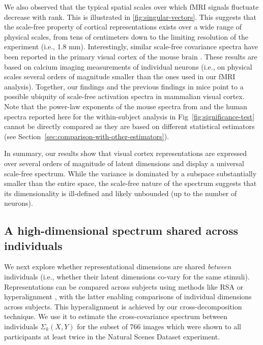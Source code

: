 \documentclass[10pt]{article}
\begin{document}
We also observed that the typical spatial scales over which fMRI signals fluctuate decrease with rank. This is illustrated in \ref{fig:singular-vectors}. This suggests that the scale-free property of cortical representations exists over a wide range of physical scales, from tens of centimeters down to the limiting resolution of the experiment (i.e., 1.8 mm). Interestingly, similar scale-free covariance spectra have been reported in the primary visual cortex of the mouse brain \autocite{Stringer2019}. These results are based on calcium imaging measurements of individual neurons (i.e., on physical scales several orders of magnitude smaller than the ones used in our fMRI analysis). Together, our findings and the previous findings in mice point to a possible ubiquity of scale-free activation spectra in mammalian visual cortex. Note that the power-law exponents of the mouse spectra from \textcite{Stringer2019} and the human spectra reported here for the within-subject analysis in Fig~\ref{fig:significance-test} cannot be directly compared as they are based on different statistical estimators (see Section~\ref{sec:comparison-with-other-estimators}).

In summary, our results show that visual cortex representations are expressed over several orders of magnitude of latent dimensions and display a universal scale-free spectrum. While the variance is dominated by a subspace substantially smaller than the entire space, the scale-free nature of the spectrum suggests that its dimensionality is ill-defined and likely unbounded (up to the number of neurons).

\subsection{A high-dimensional spectrum shared across individuals}\label{a-high-dimensional-spectrum-shared-across-individuals}

We next explore whether representational dimensions are shared \emph{between} individuals (i.e., whether their latent dimensions co-vary for the same stimuli). Representations can be compared across subjects using methods like RSA \autocite{Kriegeskorte2008} or hyperalignment \autocite{Haxby2011}, with the latter enabling comparisons of individual dimensions across subjects. This hyperalignment is achieved by our cross-decomposition technique. We use it to estimate the cross-covariance spectrum between individuals \(\Sigma_k(X, Y)\) for the subset of 766 images which were shown to all participants at least twice in the Natural Scenes Dataset experiment.
\end{document}

